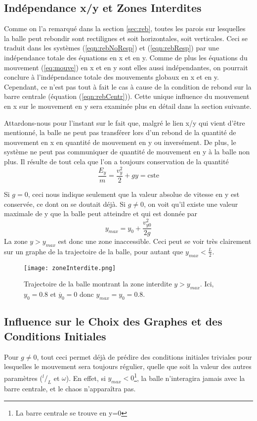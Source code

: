 \documentclass[a4paper]{report}
\begin{document}
\subsection{Indépendance x/y et Zones Interdites}
\label{sec:zoneInter}
Comme on l'a remarqué dans la section \ref{sec:reb}, toutes les parois sur lesquelles la balle peut rebondir sont rectilignes et soit horizontales, soit verticales. Ceci se traduit dans les systèmes (\ref{eqn:rebNoResp}) et (\ref{eqn:rebResp}) par une indépendance totale des équations en x et en y. Comme de plus les équations du mouvement (\ref{eq:mouve}) en x et en y sont elles aussi indépendantes, on pourrait conclure à l'indépendance totale des mouvements globaux en x et en y. Cependant, ce n'est pas tout à fait le cas à cause de la condition de rebond sur la barre centrale (équation (\ref{eqn:rebCentr})). Cette unique influence du mouvement en x sur le mouvement en y sera examinée plus en détail dans la section suivante.

Attardons-nous pour l'instant sur le fait que, malgré le lien x/y qui vient d'être mentionné, la balle ne peut pas transférer lors d'un rebond de la quantité de mouvement en x en quantité de mouvement en y ou inversément. De plus, le système ne peut pas communiquer de quantité de mouvement en y à la balle non plus. Il résulte de tout cela que l'on a toujours conservation de la quantité
\begin{equation}
\label{eqn:consY}
\frac{E_y}{m}=\frac{v_y^2}{2}+gy=\text{cste}
\end{equation}



Si \(g=0\), ceci nous indique seulement que la valeur absolue de vitesse en y est conservée, ce dont on se doutait déjà. Si \(g \neq 0 \), on voit qu'il existe une valeur maximale de y que la balle peut atteindre et qui est donnée par
\[ y_{max}=y_0 + \frac{v^2_{y0}}{2g} \]
La zone \(y>y_{max}\) est donc une zone inaccessible. Ceci peut se voir très clairement sur un graphe de la trajectoire de la balle, pour autant que \( y_{max}<\frac{L}{2} \).
\begin{figure}[h!]
   \texttt{[image: zoneInterdite.png]}
      \caption[Trajectoire de la balle montrant la zone interdite en y]{Trajectoire de la balle montrant la zone interdite \(y>y_{max}\). Ici, \(y_0=0.8\) et \(\dot{y_0}=0\) donc \(y_{max}=y_0=0.8\).}
\end{figure}

\subsection{Influence sur le Choix des Graphes et des Conditions Initiales}
\label{sec:choixCondInit}
Pour \( g \neq 0 \), tout ceci permet déjà de prédire des conditions initiales triviales pour lesquelles le mouvement sera toujours régulier, quelle que soit la valeur des autres paramètres (\(^l/_L\) et \(\omega\)). En effet, si \(y_{max}<0\)\footnote{La barre centrale se trouve en y=0}, la balle n'interagira jamais avec la barre centrale, et le chaos n'apparaîtra pas.
\end{document}
